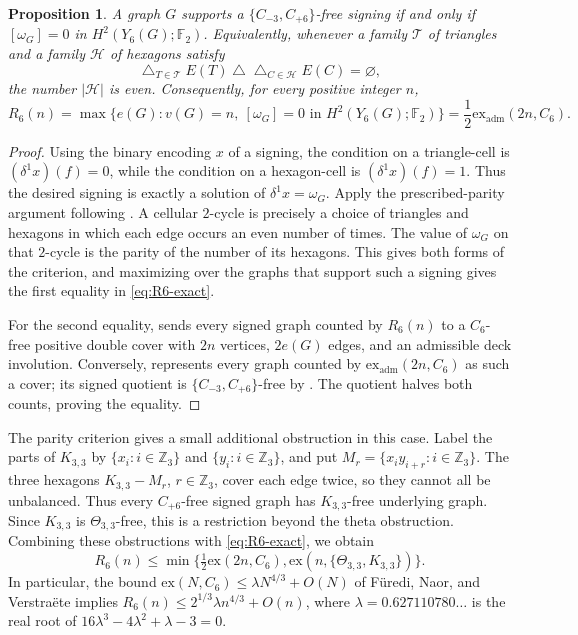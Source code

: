 \documentclass{article}
\newcommand{\ex}{\mathrm{ex}}
\newcommand{\exadm}{\ex_{\mathrm{adm}}}
\newcommand{\FF}{\mathbb{F}}
\newcommand{\Z}{\mathbb{Z}}
\newtheorem{proposition}[theorem]{Proposition}
\theoremstyle{definition}
\theoremstyle{remark}
\begin{document}
\begin{proposition}\label{thm:R6-cohomological-criterion}
\label{thm:admissible-cover-reformulation}
A graph $G$ supports a $\{C_{-3},C_{+6}\}$-free signing if and only
if $[\omega_G]=0$ in $H^2(Y_6(G);\FF_2)$.  Equivalently, whenever a
family $\mathcal T$ of triangles and a family $\mathcal H$ of hexagons satisfy
\[
\mathop{\triangle}_{T\in\mathcal T}E(T)
\mathbin\triangle
\mathop{\triangle}_{C\in\mathcal H}E(C)=\varnothing,
\]
the number $|\mathcal H|$ is even.  Consequently, for every positive integer $n$,
\begin{equation}\label{eq:R6-exact}
R_6(n)=\max\{e(G):v(G)=n,\ [\omega_G]=0
\text{ in }H^2(Y_6(G);\FF_2)\}
=\frac12\exadm(2n,C_6).
\end{equation}
\end{proposition}
\begin{proof}
Using the binary encoding $x$ of a signing, the condition on a triangle-cell
is $(\delta^1x)(f)=0$, while the condition on a hexagon-cell is
$(\delta^1x)(f)=1$.  Thus the desired signing is exactly a solution of
$\delta^1x=\omega_G$.  Apply the prescribed-parity argument following
.  A cellular $2$-cycle is precisely a
choice of triangles and hexagons in which each edge occurs an even number
of times.  The value of $\omega_G$ on that $2$-cycle is the parity of
the number of its hexagons.  This gives both forms of the criterion, and
maximizing over the graphs that support such a signing gives the first
equality in \eqref{eq:R6-exact}.

For the second equality,  sends every signed graph
counted by $R_6(n)$ to a $C_6$-free positive double cover with $2n$
vertices, $2e(G)$ edges, and an admissible deck involution.  Conversely,
 represents every graph counted by
$\exadm(2n,C_6)$ as such a cover; its signed quotient is
$\{C_{-3},C_{+6}\}$-free by .  The quotient halves
both counts, proving the equality.
\end{proof}

The parity criterion gives a small additional obstruction in this case.
Label the parts of $K_{3,3}$ by $\{x_i:i\in\Z_3\}$ and
$\{y_i:i\in\Z_3\}$, and put $M_r=\{x_iy_{i+r}:i\in\Z_3\}$.
The three hexagons $K_{3,3}-M_r$, $r\in\Z_3$, cover each edge twice,
so they cannot all be unbalanced.  Thus every $C_{+6}$-free signed graph
has $K_{3,3}$-free underlying graph.  Since $K_{3,3}$ is
$\Theta_{3,3}$-free, this is a restriction beyond the theta obstruction.
Combining these obstructions with \eqref{eq:R6-exact}, we obtain
\begin{equation}\label{thm:corrected-R6}
R_6(n)\leq\min\{\tfrac12\ex(2n,C_6),
\ex(n,\{\Theta_{3,3},K_{3,3}\})\}.
\end{equation}
In particular, the bound $\ex(N,C_6)\leq\lambda N^{4/3}+O(N)$ of
F\"uredi, Naor, and Verstra\"ete \cite{MR2227729} implies
$R_6(n)\leq2^{1/3}\lambda n^{4/3}+O(n)$, where
$\lambda=0.627110780\ldots$ is the real root of
$16\lambda^3-4\lambda^2+\lambda-3=0$.
\end{document}
